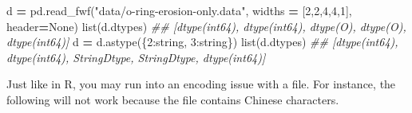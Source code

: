 \documentclass[
  12pt,
  krantz2]{krantz}
\makeatletter
\newenvironment{Shaded}{\begin{snugshade}}{\end{snugshade}}
\newcommand{\BuiltInTok}[1]{#1}
\newcommand{\CommentTok}[1]{\textcolor[rgb]{0.37,0.37,0.37}{\textit{#1}}}
\newcommand{\DecValTok}[1]{\textcolor[rgb]{0.06,0.06,0.06}{#1}}
\newcommand{\NormalTok}[1]{#1}
\newcommand{\OperatorTok}[1]{\textcolor[rgb]{0.43,0.43,0.43}{\textbf{#1}}}
\newcommand{\StringTok}[1]{\textcolor[rgb]{0.5,0.5,0.5}{#1}}
\newcommand{\VariableTok}[1]{\textcolor[rgb]{0,0,0}{#1}}
\newenvironment{kframe}{%
\medskip{}
\setlength{\fboxsep}{.8em}
 \def\at@end@of@kframe{}%
 \ifinner\ifhmode%
  \def\at@end@of@kframe{\end{minipage}}%
  \begin{minipage}{\columnwidth}%
 \fi\fi%
 \def\FrameCommand##1{\hskip\@totalleftmargin \hskip-\fboxsep
 \colorbox{shadecolor}{##1}\hskip-\fboxsep
     \hskip-\linewidth \hskip-\@totalleftmargin \hskip\columnwidth}%
 \MakeFramed {\advance\hsize-\width
   \@totalleftmargin\z@ \linewidth\hsize
   \@setminipage}}%
 {\par\unskip\endMakeFramed%
 \at@end@of@kframe}
\renewenvironment{Shaded}{\begin{kframe}}{\end{kframe}}
\makeatother
\begin{document}
\begin{Shaded}
\begin{Highlighting}[]
\NormalTok{d }\OperatorTok{=}\NormalTok{ pd.read\_fwf(}\StringTok{"data/o{-}ring{-}erosion{-}only.data"}\NormalTok{, }
\NormalTok{                widths }\OperatorTok{=}\NormalTok{ [}\DecValTok{2}\NormalTok{,}\DecValTok{2}\NormalTok{,}\DecValTok{4}\NormalTok{,}\DecValTok{4}\NormalTok{,}\DecValTok{1}\NormalTok{], header}\OperatorTok{=}\VariableTok{None}\NormalTok{)}
\BuiltInTok{list}\NormalTok{(d.dtypes)}
\CommentTok{\#\# [dtype(\textquotesingle{}int64\textquotesingle{}), dtype(\textquotesingle{}int64\textquotesingle{}), dtype(\textquotesingle{}O\textquotesingle{}), dtype(\textquotesingle{}O\textquotesingle{}), dtype(\textquotesingle{}int64\textquotesingle{})]}
\NormalTok{d }\OperatorTok{=}\NormalTok{ d.astype(\{}\DecValTok{2}\NormalTok{:}\StringTok{\textquotesingle{}string\textquotesingle{}}\NormalTok{, }\DecValTok{3}\NormalTok{:}\StringTok{\textquotesingle{}string\textquotesingle{}}\NormalTok{\}) }
\BuiltInTok{list}\NormalTok{(d.dtypes)}
\CommentTok{\#\# [dtype(\textquotesingle{}int64\textquotesingle{}), dtype(\textquotesingle{}int64\textquotesingle{}), StringDtype, StringDtype, dtype(\textquotesingle{}int64\textquotesingle{})]}
\end{Highlighting}
\end{Shaded}

Just like in R, you may run into an encoding issue with a file. For instance, the following will not work because the file contains Chinese characters.
\end{document}
